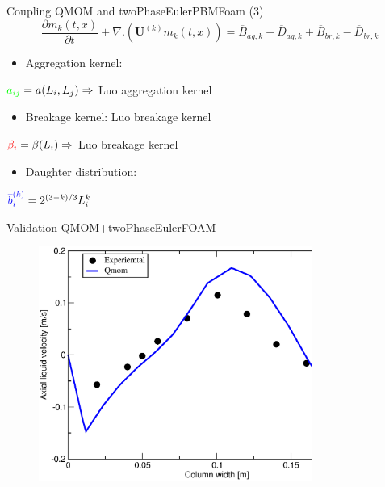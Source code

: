 \documentclass{beamer}
\begin{document}
\begin{frame}{Coupling QMOM and twoPhaseEulerPBMFoam (3)}
\begin{equation*}
\frac{\partial m_k (t,x)}{\partial t}+\nabla .(\textbf{U}^{(k)}m_k(t,x)) = \overline{B}_{ag,k}-\overline{D}_{ag,k} +\overline{B}_{br,k}-\overline{D}_{br,k}
\end{equation*}

\begin{itemize}
\item Aggregation kernel: 
\end{itemize}
\begin{center}
$\textcolor{green}{a_{ij}}=a(L_i,L_j)\Rightarrow$ Luo aggregation kernel
\end{center}

\begin{itemize}
\item Breakage kernel: Luo breakage kernel
\end{itemize}
\begin{center}
$\textcolor{red}{\beta_{i}}=\beta(L_i)\Rightarrow$ Luo breakage kernel
\end{center}

\begin{itemize}
\item Daughter distribution: 
\end{itemize}
\begin{center}
$\textcolor{blue}{\overline{b}^{(k)}_i}=2^{(3-k)/3}L_i^k$
\end{center} 
\end{frame}

\begin{frame}{Validation QMOM+twoPhaseEulerFOAM}
   \begin{figure}[H]
     \includegraphics[width=0.8\textwidth,keepaspectratio]{comparison}

\end{figure} 

\end{frame}
\end{document}
